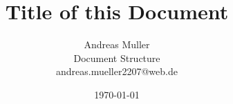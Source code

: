 \documentclass[11pt,a4paper,titlepage,twocolumn]{article}
\begin{document}
\title{Title of this Document}
\author{Andreas Muller \\ \latex Document Structure \\ andreas.mueller2207@web.de}
\date{\today}
\maketitle


\lipsum
\end{document}
